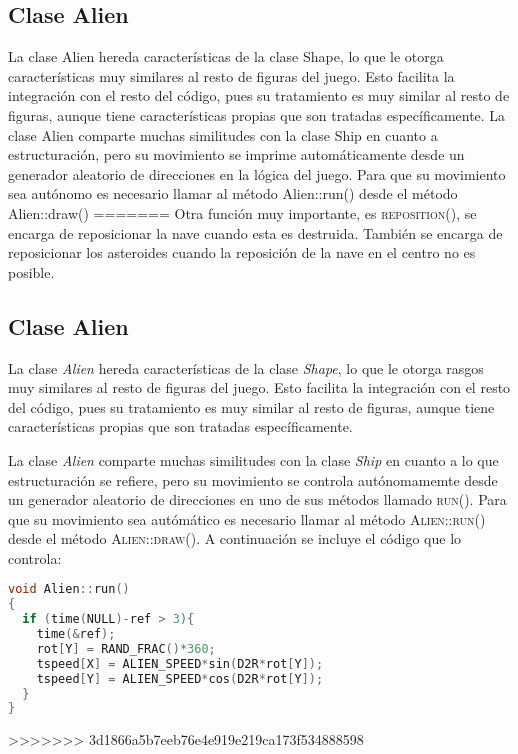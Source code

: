\subsection{Clase Alien}
La clase Alien hereda características de la clase Shape, lo que le otorga características muy similares al resto de figuras del juego. Esto facilita la integración con el resto del código, pues su tratamiento es muy similar al resto de figuras, aunque tiene características propias que son tratadas específicamente. La clase Alien comparte muchas similitudes con la clase Ship en cuanto a estructuración, pero su movimiento se imprime automáticamente desde un generador aleatorio de direcciones en la lógica del juego. Para que su movimiento sea autónomo es necesario llamar al método Alien::run() desde el método Alien::draw()
=======
Otra función muy importante, es \textsc{reposition()}, se encarga de reposicionar la nave cuando esta es destruida. También se encarga de reposicionar los asteroides cuando la reposición de la nave en el centro no es posible.

\subsection{Clase Alien}
La clase \emph{Alien} hereda características de la clase \emph{Shape}, lo que le otorga rasgos muy similares al resto de figuras del juego. 
Esto facilita la integración con el resto del código, pues su tratamiento es muy similar al resto de figuras, aunque tiene características propias que son tratadas específicamente. 

La clase \emph{Alien} comparte muchas similitudes con la clase \emph{Ship} en cuanto a lo que estructuración se refiere, pero su movimiento se controla autónomamemte desde un generador aleatorio de direcciones en uno de sus métodos llamado \textsc{run()}. Para que su movimiento sea autómático es necesario llamar al método \textsc{Alien::run()} desde el método \textsc{Alien::draw()}. A continuación se incluye el código que lo controla:

\lstset{style=mystyle}
\begin{lstlisting}[language=C++, title=Movimiento errático del \emph{Alien} gracias a la función \textsc{run()}, frame=single, numbers=none]
void Alien::run()
{ 
  if (time(NULL)-ref > 3){
    time(&ref);
    rot[Y] = RAND_FRAC()*360;
    tspeed[X] = ALIEN_SPEED*sin(D2R*rot[Y]);
    tspeed[Y] = ALIEN_SPEED*cos(D2R*rot[Y]);
  }
}
\end{lstlisting}
>>>>>>> 3d1866a5b7eeb76e4e919e219ca173f534888598
